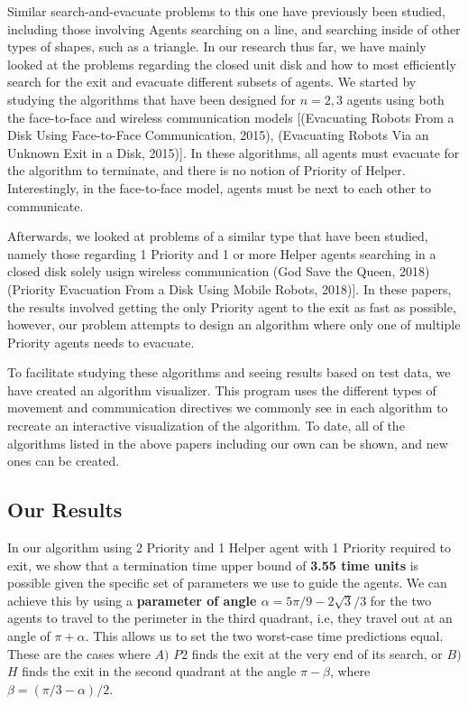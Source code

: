 \documentclass[11pt]{amsart}
\begin{document}
Similar search-and-evacuate problems to this one have previously been studied, including those involving Agents
searching on a line, and searching inside of other types of shapes, such as a triangle.
In our research thus far, we have mainly looked at the problems regarding
the closed unit disk and how to most efficiently search for the exit and evacuate
different subsets of agents. We started by studying the algorithms that have been designed
for $n = 2, 3$ agents using both the face-to-face and wireless communication models [(Evacuating Robots
From a Disk Using Face-to-Face Communication, 2015), (Evacuating Robots Via an Unknown Exit in a Disk, 2015)].
In these algorithms, all agents must evacuate for the algorithm to terminate, and there is no notion of
Priority of Helper. Interestingly, in the face-to-face model, agents must be next to each other to
communicate.


Afterwards, we looked at problems of a similar type that have been studied,
namely those regarding 1 Priority and 1 or more Helper agents searching in a
closed disk solely usign wireless communication (God Save the Queen, 2018)
(Priority Evacuation From a Disk Using Mobile Robots, 2018)].
In these papers, the results involved getting the only Priority agent to the exit
as fast as possible, however, our problem attempts to design an algorithm where
only one of multiple Priority agents needs to evacuate.


To facilitate studying these algorithms and seeing results based on test data, we
have created an algorithm visualizer. This program uses the different types of movement and
communication directives we commonly see in each algorithm to recreate an
interactive visualization of the algorithm. To date, all of the algorithms
listed in the above papers including our own can be shown, and new ones can be created.


\subsection{Our Results}

In our algorithm using 2 Priority and 1 Helper agent with 1 Priority required to exit, we show that a termination time
upper bound of \textbf{3.55 time units} is possible given the specific set of parameters we use
to guide the agents. We can achieve this by using a \textbf{parameter of angle $\alpha = 5 \pi / 9 - 2\sqrt3 /3$} for the two agents to travel to the perimeter in the third quadrant, i.e, they travel out at
an angle of \textbf{$\pi + \alpha$}. This allows us to set the two worst-case time predictions equal.
These are the cases where \textbf{$A)$} $P2$ finds the exit at the very end of its search,
or \textbf{$B)$} $H$ finds the exit in the second quadrant at the angle \textbf{$\pi - \beta$},
where \textbf{$\beta = ( \pi / 3 - \alpha) / 2$}.
\end{document}
